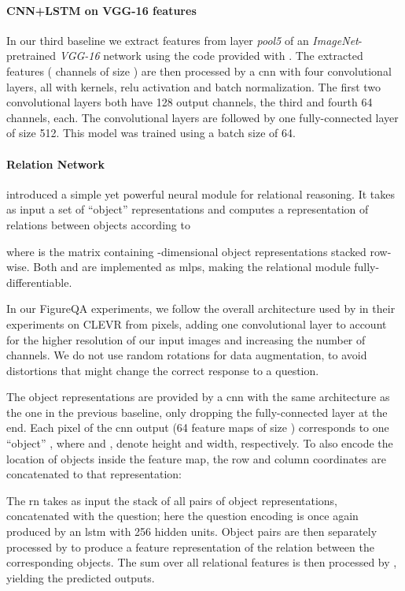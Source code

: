 \documentclass{article} \usepackage{iclr2018_workshop,times}
\begin{document}
\paragraph{CNN+LSTM on VGG-16 features}
In our third baseline we extract features from layer \emph{pool5} of an \emph{ImageNet}-pretrained \emph{VGG-16} network \citep{simonyan2014very} using the code provided with \citet{hu2017learning}. 
The extracted features ( channels of size ) are then processed by a \gls{cnn} with four convolutional layers, all with  kernels, \gls{relu} activation and batch normalization. The first two convolutional layers both have 128 output channels, the third and fourth 64 channels, each.
The convolutional layers are followed by one fully-connected layer of size 512. This model was trained using a batch size of 64.


\paragraph{Relation Network} 
\citet{santoro2017simple} introduced a simple yet powerful neural module for relational reasoning. It takes as input a set of  ``object'' representations  and computes a representation of relations between objects according to

where  is the matrix containing  -dimensional object representations  stacked row-wise.
Both  and  are implemented as \glspl{mlp}, making the relational module fully-differentiable.

In our FigureQA experiments, we follow the overall architecture used by \citet{santoro2017simple} in their experiments on CLEVR from pixels, adding one convolutional layer to account for the higher resolution of our input images and increasing the number of channels. We do not use random rotations for data augmentation, to avoid distortions that might change the correct response to a question.

The object representations are provided by a \gls{cnn} with the same architecture as the one in the previous baseline, only dropping the fully-connected layer at the end. 
Each pixel of the \gls{cnn} output (64 feature maps of size ) corresponds to one ``object'' ,
where  and , denote height and width, respectively. 
To also encode the location of objects inside the feature map, the row and column coordinates are concatenated to that representation:


The \gls{rn} takes as input the stack of all pairs of object representations, concatenated with the question; here the question encoding is once again produced by an \gls{lstm} with 256 hidden units. 
Object pairs are then separately processed by  to produce a feature representation of the relation between the corresponding objects. The sum over all relational features is then processed by , yielding the predicted outputs.
\end{document}
